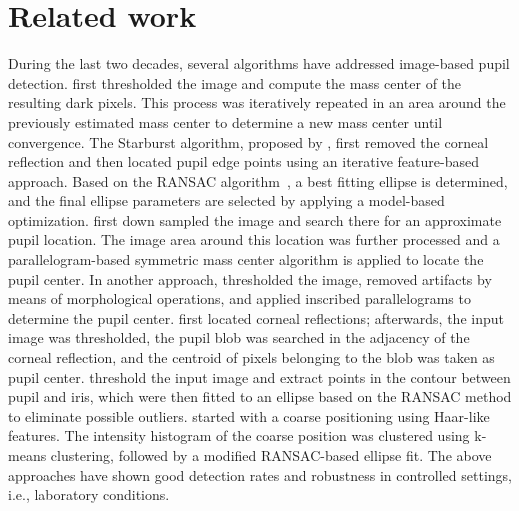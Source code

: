 \section{Related work}
\label{sec:related}

During the last two decades, several algorithms have addressed image-based pupil detection.
\citet{perez2003precise} first thresholded the image and compute the mass center of the resulting dark pixels. This process was iteratively repeated in an area
around the previously estimated mass center to determine a new mass center until convergence.
The Starburst algorithm, proposed by \citet{li2005starburst}, first
removed the corneal reflection and then located pupil edge points using an iterative feature-based approach.
Based on the RANSAC algorithm~\citet{fischler1981random}, a
best fitting ellipse is determined, and the final ellipse parameters are selected by applying a model-based optimization.
\citet{long2007high} first down sampled the image and search there for an approximate pupil location. The image area around this location was further processed and a parallelogram-based symmetric mass center algorithm is
applied to locate the pupil center.
In another approach, \citet{lin2010robust} thresholded the image, removed
artifacts by means of morphological operations, and applied inscribed
parallelograms to determine the pupil center.
\citet{keil2010real} first located corneal reflections; afterwards,
the input image was thresholded, the pupil blob was searched in the adjacency of
the corneal reflection, and the centroid of pixels belonging to the blob was
taken as pupil center.
\citet{san2010evaluation} threshold the input image and extract
points in the contour between pupil and iris, which were then fitted to an
ellipse based on the RANSAC method to eliminate possible outliers.
\citet{swirski2012robust} started with
a coarse positioning using Haar-like features. The intensity histogram of the coarse position was clustered using  k-means clustering, followed by a modified RANSAC-based ellipse fit.
The above approaches have shown good detection rates and robustness  in controlled settings, i.e., laboratory conditions.

